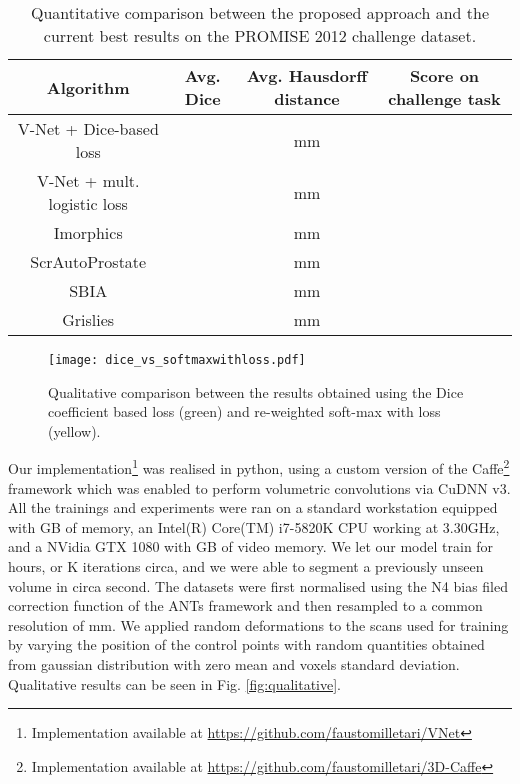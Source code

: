 \documentclass{llncs}
\begin{document}
\begin{table}
\caption{Quantitative comparison between the proposed approach and the current best results on the PROMISE 2012 challenge dataset.} \label{tab:res}
\begin{tabular}{|c|c|c|c|}
\hline 
Algorithm & Avg. Dice & Avg. Hausdorff distance & Score on challenge task\tabularnewline
\hline 
\hline 
V-Net + Dice-based loss &  &  mm & \tabularnewline
\hline 
V-Net + mult. logistic loss &  &  mm & \tabularnewline
\hline 
Imorphics \cite{imorp} &  &  mm & \tabularnewline
\hline 
ScrAutoProstate &  &  mm &  \tabularnewline
\hline
SBIA &  &  mm &  \tabularnewline
\hline
Grislies &  &  mm &  \tabularnewline
\hline

\end{tabular}

\end{table}

\begin{figure} 	
\centering 	
\texttt{[image: dice\_vs\_softmaxwithloss.pdf]} 	
\caption{Qualitative comparison between the results obtained using the Dice coefficient based loss (green) and re-weighted soft-max with loss (yellow).} \label{fig:qualitativecomparison} 
\end{figure}

Our implementation\footnote{Implementation available at \url{https://github.com/faustomilletari/VNet}} was realised in python, using a custom version of the Caffe\footnote{Implementation available at \url{https://github.com/faustomilletari/3D-Caffe}} \cite{jia2014caffe} framework which was enabled to perform volumetric convolutions via CuDNN v3. All the trainings and experiments were ran on a standard workstation equipped with  GB of memory, an Intel(R) Core(TM) i7-5820K CPU working at 3.30GHz, and a NVidia GTX 1080 with  GB of video memory. We let our model train for  hours, or K iterations circa, and we were able to segment a previously unseen volume in circa  second. The datasets were first normalised using the N4 bias filed correction function of the ANTs framework \cite{tustison2010n4itk} and then resampled to a common resolution of  mm. We applied random deformations to the scans used for training by varying the position of the control points with random quantities obtained from gaussian distribution with zero mean and  voxels standard deviation. Qualitative results can be seen in Fig. \ref{fig:qualitative}. 
\end{document}
